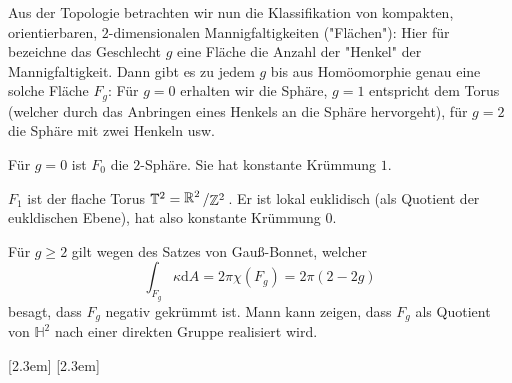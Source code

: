 \documentclass[11pt]{book}
\numberwithin{dummy}{section}
\theoremstyle{nonumberbreak}
\newcommand{\Z}{\mathbb{Z}}
\newcommand{\R}{\mathbb{R}}
\newcommand{\He}{\mathbb{H}}
\renewcommand*\thechapter{\arabic{chapter}}
\newcommand{\slant}[2]{{\raisebox{.1em}{$#1$}\left/\raisebox{-.1em}{$#2$}\right.}}
\begin{document}
\begin{spacing}{1.4}
Aus der Topologie betrachten wir nun die Klassifikation von kompakten, orientierbaren, $2$-dimensionalen Mannigfaltigkeiten ("Flächen"): Hier für bezeichne das Geschlecht $g$ eine Fläche die Anzahl der "Henkel" der Mannigfaltigkeit. Dann gibt es zu jedem $g$ bis aus Homöomorphie genau eine solche Fläche $F_g$: Für $g=0$ erhalten wir die Sphäre, $g=1$ entspricht dem Torus (welcher durch das Anbringen eines Henkels an die Sphäre hervorgeht), für $g=2$ die Sphäre mit zwei Henkeln usw.
\begin{compactitem}
\item Für $g=0$ ist $F_0$ die $2$-Sphäre. Sie hat konstante Krümmung $1$.
\item $F_1$ ist der flache Torus $\mathbb{T}^2 = \slant{\R^2}{\Z^2}$. Er ist lokal euklidisch (als Quotient der eukldischen Ebene), hat also konstante Krümmung $0$. 
\item Für $g\geqslant 2$ gilt wegen des Satzes von Gauß-Bonnet, welcher
$$\int_{F_g} \kappa \mathrm{d}A = 2 \pi \chi(F_g) = 2\pi (2-2g)$$
besagt, dass $F_g$ negativ gekrümmt ist. Mann kann zeigen, dass $F_g$ als Quotient von $\He^2$ nach einer direkten Gruppe realisiert wird.
\end{compactitem}









\newpage
\thispagestyle{empty}























\clearpage
\titlespacing{\chapter}
             {0pc}{*7}{*5}[0pc]
\renewcommand*\thechapter{\Alph{chapter}}

\setcounter{chapter}{0}


[2.3em]{\addvspace{2pc}\bfseries}{\contentslabel{2em}}{}{\contentspage}
[2.3em]{}{\contentslabel{4em}}{}{\contentspage}


\end{spacing}
\end{document}
